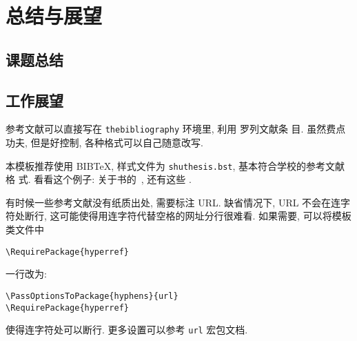 \chapter{总结与展望}
\label{cha:c5}

\section{课题总结}

\section{工作展望}

参考文献可以直接写在 \texttt{thebibliography} 环境里, 利用  罗列文献条
目. 虽然费点功夫, 但是好控制, 各种格式可以自己随意改写.

本模板推荐使用 BIB\TeX, 样式文件为 \texttt{shuthesis.bst}, 基本符合学校的参考文献格
式. 看看这个例子: 关于书的~\cite{tex1989,algebra2000}, 还有这些 \cite{nikiforov2014,
    BuFanZhou2016:Z-eigenvalues,HuQiShao2013:Cored-Hypergraphs,KangNikiforov2014:Extremal-Problems,
    LinZhou2016:Distance-Spectral,LuMan2016:Small-Spectral-Radius,Nikiforov2017:Symmetric-Spectrum,
    Qi2014:H-Plus-Eigenvalues}.

有时候一些参考文献没有纸质出处, 需要标注 URL. 缺省情况下, URL 不会在连字符处断行,
这可能使得用连字符代替空格的网址分行很难看. 如果需要, 可以将模板类文件中
\begin{verbatim}
\RequirePackage{hyperref}
\end{verbatim}
一行改为:
\begin{verbatim}
\PassOptionsToPackage{hyphens}{url}
\RequirePackage{hyperref}
\end{verbatim}
使得连字符处可以断行. 更多设置可以参考 \texttt{url} 宏包文档.